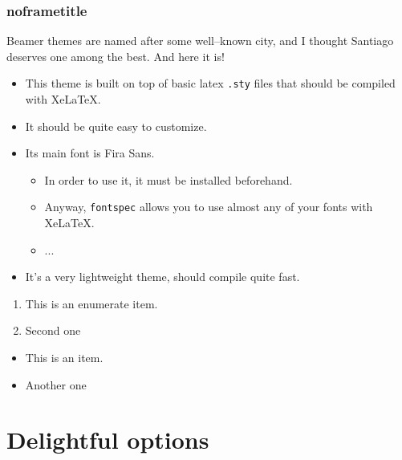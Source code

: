 \documentclass[aspectratio=169]{beamer}
\begin{document}
\begin{frame}
\frametitle{noframetitle}

Beamer themes are named after some well--known city, and I thought Santiago
deserves one among the best. And here it is!

\begin{itemize}
  \item This theme is built on top of basic latex \texttt{.sty} files that should be compiled with XeLaTeX.
  \item It should be quite easy to customize.
  \item Its main font is Fira Sans.
  \begin{itemize}
    \item In order to use it, it must be installed beforehand.
    \item Anyway, \texttt{fontspec} allows you to use almost any of your fonts with XeLaTeX.
    \item ...
  \end{itemize}
  \item It's a very lightweight theme, should compile quite fast.
\end{itemize}



\begin{enumerate}
  \item This is an enumerate item.
  \item Second one
\end{enumerate}

\begin{itemize}
  \item This is an item.
  \item Another one
\end{itemize}

\end{frame}





\section{Delightful options}
\end{document}
